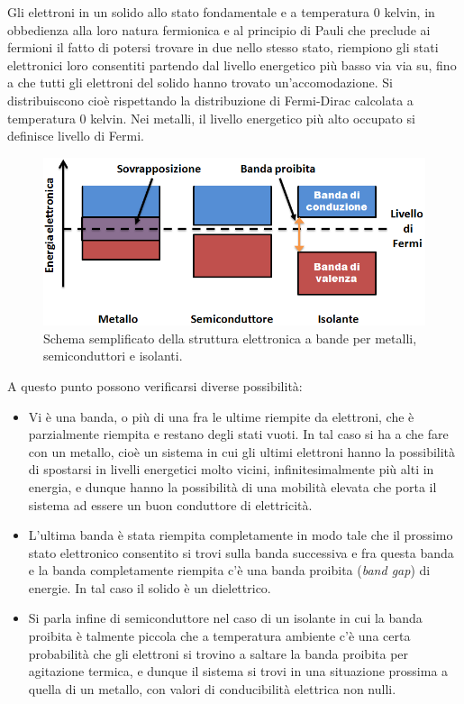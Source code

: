 \documentclass[
]{book}
\providecommand{\tightlist}{%
  \setlength{\itemsep}{0pt}\setlength{\parskip}{0pt}}
\begin{document}
Gli elettroni in un solido allo stato fondamentale e a temperatura \(0\)
kelvin, in obbedienza alla loro natura fermionica e al principio di
Pauli che preclude ai fermioni il fatto di potersi trovare in due nello
stesso stato, riempiono gli stati elettronici loro consentiti partendo
dal livello energetico più basso via via su, fino a che tutti gli
elettroni del solido hanno trovato un'accomodazione. Si distribuiscono
cioè rispettando la distribuzione di Fermi-Dirac calcolata a temperatura
0 kelvin. Nei metalli, il livello energetico più alto occupato si
definisce livello di Fermi.

\begin{figure}
\centering
\includegraphics[width=0.5\linewidth,height=\textheight,keepaspectratio]{immagini/bande.png}
\caption{Schema semplificato della struttura elettronica a bande per
metalli, semiconduttori e isolanti.}
\end{figure}

A questo punto possono verificarsi diverse possibilità:

\begin{itemize}
\tightlist
\item
  Vi è una banda, o più di una fra le ultime riempite da elettroni, che
  è parzialmente riempita e restano degli stati vuoti. In tal caso si ha
  a che fare con un metallo, cioè un sistema in cui gli ultimi elettroni
  hanno la possibilità di spostarsi in livelli energetici molto vicini,
  infinitesimalmente più alti in energia, e dunque hanno la possibilità
  di una mobilità elevata che porta il sistema ad essere un buon
  conduttore di elettricità.
\item
  L'ultima banda è stata riempita completamente in modo tale che il
  prossimo stato elettronico consentito si trovi sulla banda successiva
  e fra questa banda e la banda completamente riempita c'è una banda
  proibita (\emph{band gap}) di energie. In tal caso il solido è un
  dielettrico.
\item
  Si parla infine di semiconduttore nel caso di un isolante in cui la
  banda proibita è talmente piccola che a temperatura ambiente c'è una
  certa probabilità che gli elettroni si trovino a saltare la banda
  proibita per agitazione termica, e dunque il sistema si trovi in una
  situazione prossima a quella di un metallo, con valori di
  conducibilità elettrica non nulli.
\end{itemize}
\end{document}
